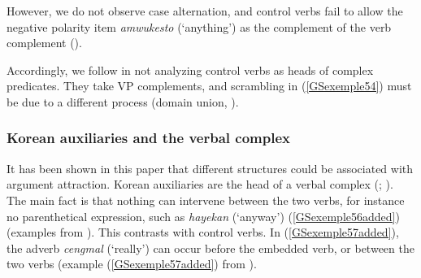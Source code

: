 \documentclass[output=paper
	        ,collection
	        ,collectionchapter
 	        ,biblatex
                ,babelshorthands
                ,newtxmath
                ,draftmode
                ,colorlinks, citecolor=brown
]{langscibook}
\begin{document}
{\eal
	\label{GSexemple55} 
	\label{GSexemple55a}
		
	\label{GSexemple55b}
\zl

However, we do not observe case alternation, and control verbs fail to allow the negative polarity item \emph{amwukesto} (`anything') as the complement of the verb complement (\citealt[91]{Kim2016a-u}).

\eal
	\label{GSexemple55added} 
	\label{GSexemple55addeda}
	
	\label{GSexemple55addedb}
\zl

Accordingly, we follow \cite{Kim2016a-u} in not analyzing control verbs as heads of complex predicates. They take VP complements, and scrambling in (\ref{GSexemple54}) must be due to a different process (domain union, \citealt{Reape94a}).


\subsubsection{Korean auxiliaries and the verbal complex}\label{GSsection4.2.2}

It has been shown in this paper that different structures could be associated with argument attraction. Korean auxiliaries are the head of a verbal complex (\citealt{Chung98a-u}; \citealt{Kim2016a-u}). The main fact is that nothing can intervene between the two verbs, for instance no parenthetical expression, such as \emph{hayekan} (`anyway') (\ref{GSexemple56added}) (examples from \citealt[162]{Chung98a-u}). This contrasts with control verbs. In (\ref{GSexemple57added}), the adverb \emph{cengmal} (`really') can occur before the embedded verb, or between the two verbs (example (\ref{GSexemple57added}) from \citealt[93]{Kim2016a-u}).


}
\end{document}
